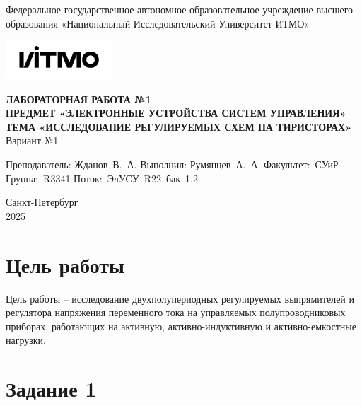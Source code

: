 \documentclass[a4paper, 12pt]{article}
\begin{document}
    \begin{titlepage}

        \begin{center}
        Федеральное государственное автономное образовательное учреждение высшего образования
        «Национальный Исследовательский Университет ИТМО»
        \vfill
        
        \includegraphics[width=0.3\textwidth]{itmo.png} %

        {\large\bf ЛАБОРАТОРНАЯ РАБОТА №1}\\
        {\large\bf ПРЕДМЕТ «ЭЛЕКТРОННЫЕ УСТРОЙСТВА СИСТЕМ УПРАВЛЕНИЯ»}\\
        {\large\bf ТЕМА «ИССЛЕДОВАНИЕ РЕГУЛИРУЕМЫХ СХЕМ НА ТИРИСТОРАХ»}\\
        Вариант №1
        \vfill

        \begin{flushright}
            \begin{minipage}{.45\textwidth}
            {
                \hbox{Преподаватель:}
                \hbox{Жданов В. А.}
                \hbox{}
                \hbox{Выполнил:}
                \hbox{Румянцев А. А.}
                \hbox{}
                \hbox{Факультет: СУиР}
                \hbox{Группа: R3341}
                \hbox{Поток: ЭлУСУ R22 бак 1.2}
            }
            \end{minipage}
        \end{flushright}
        \vfill
  
        Санкт-Петербург\\
        2025
        \end{center}
    \end{titlepage}
    
    \tableofcontents

    \newpage
    \section{Цель работы}
    Цель работы -- исследование двухполупериодных регулируемых выпрямителей и регулятора
    напряжения переменного тока на управляемых полупроводниковых приборах, работающих на
    активную, активно-индуктивную и активно-емкостные нагрузки.


    \section{Задание 1}
\end{document}
